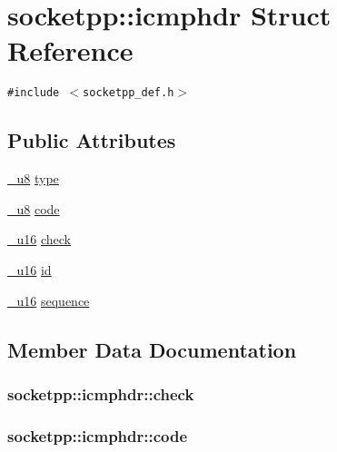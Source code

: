 \hypertarget{structsocketpp_1_1icmphdr}{
\section{socketpp::icmphdr Struct Reference}
\label{structsocketpp_1_1icmphdr}
}
{\tt \#include $<$socketpp\_\-def.h$>$}

\subsection*{Public Attributes}
\begin{CompactItemize}
\item 
\hyperlink{namespacesocketpp_1398da7d8125cdb32e89041e5b0adb96}{\_\-u8} \hyperlink{structsocketpp_1_1icmphdr_f73226605c96acf2bc9ae861d45adf52}{type}
\item 
\hyperlink{namespacesocketpp_1398da7d8125cdb32e89041e5b0adb96}{\_\-u8} \hyperlink{structsocketpp_1_1icmphdr_0c7d190da0918ead6cf93e3947fcc7f9}{code}
\item 
\hyperlink{namespacesocketpp_0d48e817f00cbb84d07faec41ee4b169}{\_\-u16} \hyperlink{structsocketpp_1_1icmphdr_253e897a729f05ce8a79eb085674940c}{check}
\item 
\hyperlink{namespacesocketpp_0d48e817f00cbb84d07faec41ee4b169}{\_\-u16} \hyperlink{structsocketpp_1_1icmphdr_a149822bbb52234fb048c83c9bed9189}{id}
\item 
\hyperlink{namespacesocketpp_0d48e817f00cbb84d07faec41ee4b169}{\_\-u16} \hyperlink{structsocketpp_1_1icmphdr_e696676883b273ad81a70ccff1549ce8}{sequence}
\end{CompactItemize}


\subsection{Member Data Documentation}
\hypertarget{structsocketpp_1_1icmphdr_253e897a729f05ce8a79eb085674940c}{
\subsubsection[{check}]{ {\bf socketpp::icmphdr::check}}}
\label{structsocketpp_1_1icmphdr_253e897a729f05ce8a79eb085674940c}


\hypertarget{structsocketpp_1_1icmphdr_0c7d190da0918ead6cf93e3947fcc7f9}{
\subsubsection[{code}]{ {\bf socketpp::icmphdr::code}}}
\label{structsocketpp_1_1icmphdr_0c7d190da0918ead6cf93e3947fcc7f9}


